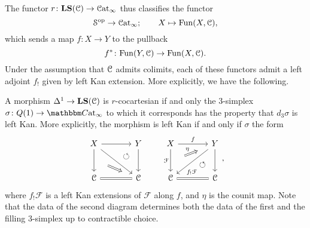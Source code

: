 \documentclass[main.tex]{subfiles}
\begin{document}
The functor $r\colon \mathbf{LS}(\mathcal{C}) \to \mathcal{C}\mathrm{at}_{\infty}$ thus classifies the functor
\begin{equation*}
  \mathcal{S}^{\mathrm{op}} \to \mathcal{C}\mathrm{at}_{\infty};\qquad X \mapsto \mathrm{Fun}(X, \mathcal{C}),
\end{equation*}
which sends a map $f\colon X \to Y$ to the pullback
\begin{equation*}
  f^{*}\colon \mathrm{Fun}(Y, \mathcal{C}) \to \mathrm{Fun}(X, \mathcal{C}).
\end{equation*}
Under the assumption that $\mathcal{C}$ admits colimits, each of these functors admit a left adjoint $f_{!}$ given by left Kan extension. More explicitly, we have the following.
\begin{proposition}
  A morphism $\Delta^{1} \to \mathbf{LS}(\mathcal{C})$ is $r$-cocartesian if and only the 3-simplex $\sigma\colon Q(1) \to \ICCat$ to which it corresponds has the property that $d_{3}\sigma$ is left Kan. More explicitly, the morphism is left Kan if and only if $\sigma$ the form
  \begin{equation*}
    \begin{tikzcd}[column sep=large, row sep=large]
      X
      \arrow[r]
      \arrow[d, ""{name=L, right}]
      \arrow[dr]
      & Y
      \arrow[d, ""{name=R, left}]
      \arrow[from=l, to=R, phantom, near end, "\circlearrowleft"{description}]
      \\
      \category{C}
      & \category{C}
      \arrow[l, equals]
      \arrow[from=L, Rightarrow, shorten=3ex]
    \end{tikzcd}
    \qquad
    \begin{tikzcd}[column sep=large, row sep=large]
      X
      \arrow[r, "f"]
      \arrow[d, "\mathcal{F}"{swap}, ""{name=L, right}]
      & Y
      \arrow[d, ""{name=R, left}]
      \arrow[dl, near end, "f_{!}\mathcal{F}"]
      \\
      \category{C}
      \arrow[from=R, phantom, near start, "\circlearrowleft"{description}]
      & \category{C}
      \arrow[l, equals]
      \arrow[from=L, to=u, shorten=3ex, Rightarrow, "\eta"]
    \end{tikzcd},
  \end{equation*}
  where $f_{!}\mathcal{F}$ is a left Kan extensions of $\mathcal{F}$ along $f$, and $\eta$ is the counit map. Note that the data of the second diagram determines both the data of the first and the filling 3-simplex up to contractible choice.
\end{proposition}
\end{document}
